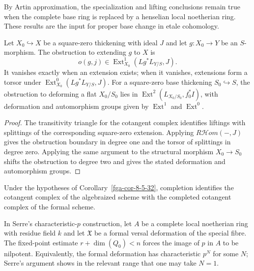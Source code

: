 \begin{remark}\label{fga-rem-8-5-13}
By Artin approximation, the specialization and lifting conclusions remain true
when the complete base ring is replaced by a henselian local noetherian ring.
These results are the input for proper base change in etale cohomology.
\end{remark}

\begin{theorem}\label{fga-the-8-5-31}
Let $X_0\hookrightarrow X$ be a square-zero thickening with ideal $J$ and let
$g:X_0\to Y$ be an $S$-morphism.  The obstruction to extending $g$ to $X$ is
\[
o(g,j)\in\operatorname{Ext}^1_{X_0}(Lg^*L_{Y/S},J).
\]
It vanishes exactly when an extension exists; when it vanishes, extensions form
a torsor under $\operatorname{Ext}^0_{X_0}(Lg^*L_{Y/S},J)$.  For a square-zero
base thickening $S_0\hookrightarrow S$, the obstruction to deforming a flat
$X_0/S_0$ lies in $\operatorname{Ext}^2(L_{X_0/S_0},f_0^*I)$, with deformation
and automorphism groups given by $\operatorname{Ext}^1$ and $\operatorname{Ext}^0$.
\end{theorem}
\begin{proof}
The transitivity triangle for the cotangent complex identifies liftings with
splittings of the corresponding square-zero extension.  Applying
$R\mathcal Hom(-,J)$ gives the obstruction boundary in degree one and the
torsor of splittings in degree zero.  Applying the same argument to the
structural morphism $X_0\to S_0$ shifts the obstruction to degree two and gives
the stated deformation and automorphism groups.
\end{proof}

\begin{remark}\label{fga-rem-8-5-33}
Under the hypotheses of Corollary~\ref{fga-cor-8-5-32}, completion identifies
the cotangent complex of the algebraized scheme with the completed cotangent
complex of the formal scheme.
\end{remark}

\begin{remark}\label{fga-rem-8-6-8}\uses{}
In Serre's characteristic-$p$ construction, let $A$ be a complete local
noetherian ring with residue field $k$ and let $\mathfrak X$ be a formal versal
deformation of the special fibre.  The fixed-point estimate
$r+\dim(Q_0)<n$ forces the image of $p$ in $A$ to be nilpotent.  Equivalently,
the formal deformation has characteristic $p^N$ for some $N$; Serre's argument
shows in the relevant range that one may take $N=1$.
\end{remark}
